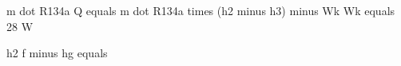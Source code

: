 m dot R134a  
Q equals m dot R134a times (h2 minus h3) minus Wk  
Wk equals 28 W  

h2 f minus hg equals